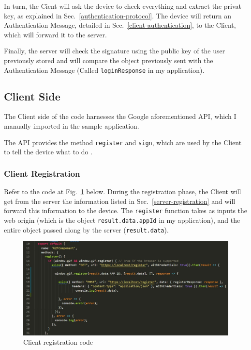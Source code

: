 In turn, the Cient will ask the device to check everything and extract the privat key, as explained in Sec.~\ref{authentication-protocol}. The device will return an Authentication Message, detailed in Sec.~\ref{client-authentication}, to the Client, which will forward it to the server.

Finally, the server will check the signature using the public key of the user previously stored and will compare the object previously sent with the Authentication Message (Called \texttt{loginResponse} in my application).

\subsection{Client Side}
The Client side of the code harnesses the Google aforementioned API, which I manually imported in the sample application.

The API provides the method \texttt{register} and \texttt{sign}, which are used by the Client to tell the device what to do \cite{lang2016security}.

\subsubsection{Client Registration}\label{client-registration}
Refer to the code at Fig.~\ref{fig:client-registration} below. During the registration phase, the Client will get from the server the information listed in Sec.~\ref{server-registration} and will forward this information to the device. The \texttt{register} function takes as inputs the web origin (which is the object \texttt{result.data.appId} in my application), and the entire object passed along by the server (\texttt{result.data}).

\begin{figure}[h]
    \centering
    \includegraphics[width=\linewidth]{resources/register-client-code.jpg}
      \caption{Client registration code}
      \label{fig:client-registration}
\end{figure}

